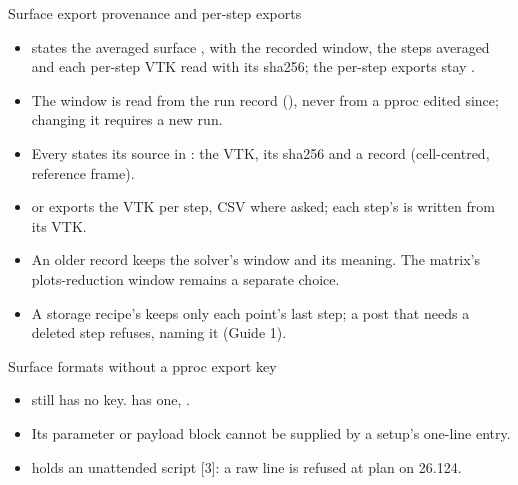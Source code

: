 \begin{frame}{Surface export provenance and per-step exports}
\begin{itemize}\small
  \item {} states the averaged surface ,
        with the recorded window, the steps averaged and each per-step VTK read
        with its sha256; the per-step exports stay .
  \item The window is read from the run record (),
        never from a pproc edited since; changing it requires a new run.
  \item Every  states its source in : the VTK,
        its sha256 and a  record (cell-centred, reference frame).
  \item {} or 
        exports the VTK per step, CSV where asked; each step's  is
        written from its VTK.
  \item An older record keeps the solver's window and its
        meaning. The matrix's plots-reduction window remains a separate choice.
  \item A storage recipe's  keeps only each
        point's last step; a post that needs a deleted step refuses, naming it
        (Guide 1).
\end{itemize}
\end{frame}

\begin{frame}{Surface formats without a pproc export key}
\begin{itemize}\small
  \item {} still has no
        \code{[exports]} key. 
        has one, .
  \item Its parameter or payload block cannot be supplied by a setup's
        one-line \code{[[raw]]} entry.
  \item {} holds an unattended script
        [3]: a raw line is refused at plan on 26.124.
\end{itemize}
\end{frame}
